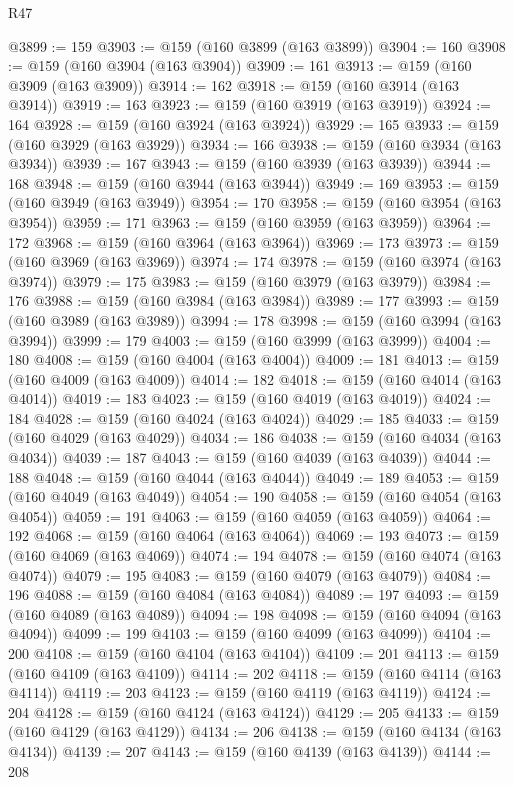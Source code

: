 \begin{lexlean}{R47}
\begin{coremodule}
@3899 := 159
@3903 := @159 (@160 @3899 (@163 @3899))
@3904 := 160
@3908 := @159 (@160 @3904 (@163 @3904))
@3909 := 161
@3913 := @159 (@160 @3909 (@163 @3909))
@3914 := 162
@3918 := @159 (@160 @3914 (@163 @3914))
@3919 := 163
@3923 := @159 (@160 @3919 (@163 @3919))
@3924 := 164
@3928 := @159 (@160 @3924 (@163 @3924))
@3929 := 165
@3933 := @159 (@160 @3929 (@163 @3929))
@3934 := 166
@3938 := @159 (@160 @3934 (@163 @3934))
@3939 := 167
@3943 := @159 (@160 @3939 (@163 @3939))
@3944 := 168
@3948 := @159 (@160 @3944 (@163 @3944))
@3949 := 169
@3953 := @159 (@160 @3949 (@163 @3949))
@3954 := 170
@3958 := @159 (@160 @3954 (@163 @3954))
@3959 := 171
@3963 := @159 (@160 @3959 (@163 @3959))
@3964 := 172
@3968 := @159 (@160 @3964 (@163 @3964))
@3969 := 173
@3973 := @159 (@160 @3969 (@163 @3969))
@3974 := 174
@3978 := @159 (@160 @3974 (@163 @3974))
@3979 := 175
@3983 := @159 (@160 @3979 (@163 @3979))
@3984 := 176
@3988 := @159 (@160 @3984 (@163 @3984))
@3989 := 177
@3993 := @159 (@160 @3989 (@163 @3989))
@3994 := 178
@3998 := @159 (@160 @3994 (@163 @3994))
@3999 := 179
@4003 := @159 (@160 @3999 (@163 @3999))
@4004 := 180
@4008 := @159 (@160 @4004 (@163 @4004))
@4009 := 181
@4013 := @159 (@160 @4009 (@163 @4009))
@4014 := 182
@4018 := @159 (@160 @4014 (@163 @4014))
@4019 := 183
@4023 := @159 (@160 @4019 (@163 @4019))
@4024 := 184
@4028 := @159 (@160 @4024 (@163 @4024))
@4029 := 185
@4033 := @159 (@160 @4029 (@163 @4029))
@4034 := 186
@4038 := @159 (@160 @4034 (@163 @4034))
@4039 := 187
@4043 := @159 (@160 @4039 (@163 @4039))
@4044 := 188
@4048 := @159 (@160 @4044 (@163 @4044))
@4049 := 189
@4053 := @159 (@160 @4049 (@163 @4049))
@4054 := 190
@4058 := @159 (@160 @4054 (@163 @4054))
@4059 := 191
@4063 := @159 (@160 @4059 (@163 @4059))
@4064 := 192
@4068 := @159 (@160 @4064 (@163 @4064))
@4069 := 193
@4073 := @159 (@160 @4069 (@163 @4069))
@4074 := 194
@4078 := @159 (@160 @4074 (@163 @4074))
@4079 := 195
@4083 := @159 (@160 @4079 (@163 @4079))
@4084 := 196
@4088 := @159 (@160 @4084 (@163 @4084))
@4089 := 197
@4093 := @159 (@160 @4089 (@163 @4089))
@4094 := 198
@4098 := @159 (@160 @4094 (@163 @4094))
@4099 := 199
@4103 := @159 (@160 @4099 (@163 @4099))
@4104 := 200
@4108 := @159 (@160 @4104 (@163 @4104))
@4109 := 201
@4113 := @159 (@160 @4109 (@163 @4109))
@4114 := 202
@4118 := @159 (@160 @4114 (@163 @4114))
@4119 := 203
@4123 := @159 (@160 @4119 (@163 @4119))
@4124 := 204
@4128 := @159 (@160 @4124 (@163 @4124))
@4129 := 205
@4133 := @159 (@160 @4129 (@163 @4129))
@4134 := 206
@4138 := @159 (@160 @4134 (@163 @4134))
@4139 := 207
@4143 := @159 (@160 @4139 (@163 @4139))
@4144 := 208

\end{coremodule}
\end{lexlean}
